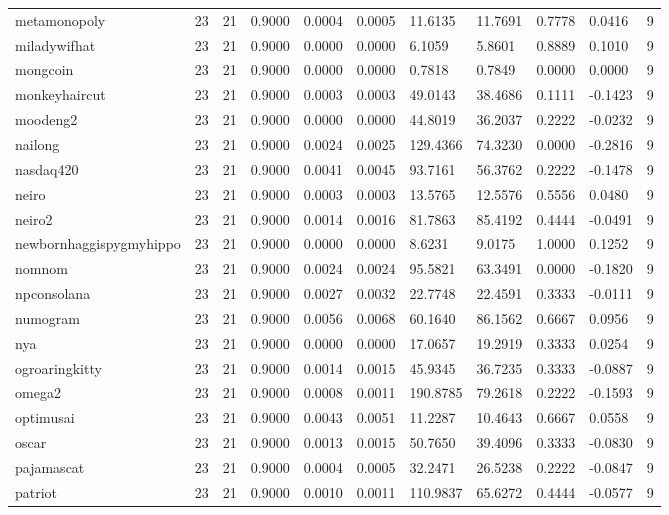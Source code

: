 \begin{table}[htbp]
\begin{tabular}{lllllllllll}
metamonopoly & 23 & 21 & 0.9000 & 0.0004 & 0.0005 & 11.6135 & 11.7691 & 0.7778 & 0.0416 & 9 \\
miladywifhat & 23 & 21 & 0.9000 & 0.0000 & 0.0000 & 6.1059 & 5.8601 & 0.8889 & 0.1010 & 9 \\
mongcoin & 23 & 21 & 0.9000 & 0.0000 & 0.0000 & 0.7818 & 0.7849 & 0.0000 & 0.0000 & 9 \\
monkeyhaircut & 23 & 21 & 0.9000 & 0.0003 & 0.0003 & 49.0143 & 38.4686 & 0.1111 & -0.1423 & 9 \\
moodeng2 & 23 & 21 & 0.9000 & 0.0000 & 0.0000 & 44.8019 & 36.2037 & 0.2222 & -0.0232 & 9 \\
nailong & 23 & 21 & 0.9000 & 0.0024 & 0.0025 & 129.4366 & 74.3230 & 0.0000 & -0.2816 & 9 \\
nasdaq420 & 23 & 21 & 0.9000 & 0.0041 & 0.0045 & 93.7161 & 56.3762 & 0.2222 & -0.1478 & 9 \\
neiro & 23 & 21 & 0.9000 & 0.0003 & 0.0003 & 13.5765 & 12.5576 & 0.5556 & 0.0480 & 9 \\
neiro2 & 23 & 21 & 0.9000 & 0.0014 & 0.0016 & 81.7863 & 85.4192 & 0.4444 & -0.0491 & 9 \\
newbornhaggispygmyhippo & 23 & 21 & 0.9000 & 0.0000 & 0.0000 & 8.6231 & 9.0175 & 1.0000 & 0.1252 & 9 \\
nomnom & 23 & 21 & 0.9000 & 0.0024 & 0.0024 & 95.5821 & 63.3491 & 0.0000 & -0.1820 & 9 \\
npconsolana & 23 & 21 & 0.9000 & 0.0027 & 0.0032 & 22.7748 & 22.4591 & 0.3333 & -0.0111 & 9 \\
numogram & 23 & 21 & 0.9000 & 0.0056 & 0.0068 & 60.1640 & 86.1562 & 0.6667 & 0.0956 & 9 \\
nya & 23 & 21 & 0.9000 & 0.0000 & 0.0000 & 17.0657 & 19.2919 & 0.3333 & 0.0254 & 9 \\
ogroaringkitty & 23 & 21 & 0.9000 & 0.0014 & 0.0015 & 45.9345 & 36.7235 & 0.3333 & -0.0887 & 9 \\
omega2 & 23 & 21 & 0.9000 & 0.0008 & 0.0011 & 190.8785 & 79.2618 & 0.2222 & -0.1593 & 9 \\
optimusai & 23 & 21 & 0.9000 & 0.0043 & 0.0051 & 11.2287 & 10.4643 & 0.6667 & 0.0558 & 9 \\
oscar & 23 & 21 & 0.9000 & 0.0013 & 0.0015 & 50.7650 & 39.4096 & 0.3333 & -0.0830 & 9 \\
pajamascat & 23 & 21 & 0.9000 & 0.0004 & 0.0005 & 32.2471 & 26.5238 & 0.2222 & -0.0847 & 9 \\
patriot & 23 & 21 & 0.9000 & 0.0010 & 0.0011 & 110.9837 & 65.6272 & 0.4444 & -0.0577 & 9 \\

\end{tabular}
\end{table}
